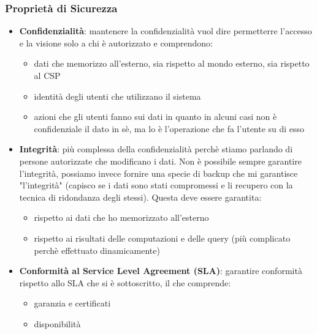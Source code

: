 \subsubsection{Proprietà di Sicurezza}
\begin{itemize}
    \item \textbf{Confidenzialità}: mantenere la confidenzialità vuol dire permetterre l'accesso e la visione solo a chi è autorizzato e comprendono:
    \begin{itemize}
        \item dati che memorizzo all'esterno, sia rispetto al mondo esterno, sia rispetto al CSP
        \item identità degli utenti che utilizzano il sistema
        \item azioni che gli utenti fanno sui dati in quanto in alcuni casi non è confidenziale il dato in sè, ma lo è l'operazione che fa l'utente su di esso
    \end{itemize}
    \item \textbf{Integrità}: più complessa della confidenzialità perchè stiamo parlando di persone autorizzate che modificano i dati. Non è possibile sempre garantire l'integrità, possiamo invece fornire una specie di backup che mi garantisce "l'integrità" (capisco se i dati sono stati compromessi e li recupero con la tecnica di ridondanza degli stessi). Questa deve essere garantita:
    \begin{itemize}
        \item rispetto ai dati che ho memorizzato all'esterno
        \item rispetto ai risultati delle computazioni e delle query (più complicato perchè effettuato dinamicamente)
    \end{itemize}
    \item \textbf{Conformità al Service Level Agreement (SLA)}: garantire conformità rispetto allo SLA che si è sottoscritto, il che comprende:
    \begin{itemize}
        \item garanzia e certificati
        \item disponibilità
    \end{itemize}
\end{itemize}

